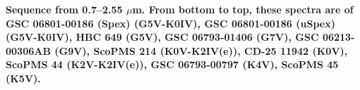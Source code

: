 {\bf Sequence from 0.7–2.55 $\mu$m. From bottom to top, these spectra are of GSC 06801-00186 (Spex) (G5V-K0IV), GSC 06801-00186 (uSpex) (G5V-K0IV), HBC 649 (G5V), GSC 06793-01406 (G7V), GSC 06213-00306AB (G9V), ScoPMS 214 (K0V-K2IV(e)), CD-25 11942 (K0V), ScoPMS 44 (K2V-K2IV(e)), GSC 06793-00797 (K4V), ScoPMS 45 (K5V). \label{fig:stack-plot-d}}